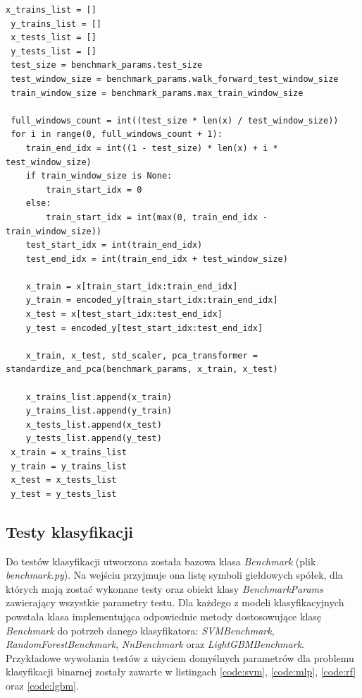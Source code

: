 \documentclass[a4paper, twoside, 11pt, openright]{article}
\begin{document}
\begin{lstlisting}[caption={Stworzenie zbiorów danych do testów metodą kroczącą (plik \textit{benchmark\_data\_preprocessing.py}).}, label={code:walk_forward_data},frame=single, captionpos=b, mathescape=true]
 x_trains_list = []
 y_trains_list = []
 x_tests_list = []
 y_tests_list = []
 test_size = benchmark_params.test_size
 test_window_size = benchmark_params.walk_forward_test_window_size
 train_window_size = benchmark_params.max_train_window_size

 full_windows_count = int((test_size * len(x) / test_window_size))
 for i in range(0, full_windows_count + 1):
    train_end_idx = int((1 - test_size) * len(x) + i * test_window_size)
    if train_window_size is None:
        train_start_idx = 0
    else:
        train_start_idx = int(max(0, train_end_idx - train_window_size))
    test_start_idx = int(train_end_idx)
    test_end_idx = int(train_end_idx + test_window_size)

    x_train = x[train_start_idx:train_end_idx]
    y_train = encoded_y[train_start_idx:train_end_idx]
    x_test = x[test_start_idx:test_end_idx]
    y_test = encoded_y[test_start_idx:test_end_idx]

    x_train, x_test, std_scaler, pca_transformer = standardize_and_pca(benchmark_params, x_train, x_test)

    x_trains_list.append(x_train)
    y_trains_list.append(y_train)
    x_tests_list.append(x_test)
    y_tests_list.append(y_test)
 x_train = x_trains_list
 y_train = y_trains_list
 x_test = x_tests_list
 y_test = y_tests_list
\end{lstlisting}

\subsection*{Testy klasyfikacji}

Do testów klasyfikacji utworzona została bazowa klasa \textit{Benchmark} (plik \textit{benchmark.py}). Na wejściu przyjmuje ona listę symboli giełdowych spółek, dla których mają zostać wykonane testy oraz obiekt klasy \textit{BenchmarkParams} zawierający wszystkie parametry testu. Dla każdego z modeli klasyfikacyjnych powstała klasa implementująca odpowiednie metody dostosowujące klasę \textit{Benchmark} do potrzeb danego klasyfikatora: \textit{SVMBenchmark}, \textit{RandomForestBenchmark}, \textit{NnBenchmark} oraz \textit{LightGBMBenchmark}. Przykładowe wywołania testów z użyciem domyślnych parametrów dla problemu klasyfikacji binarnej zostały zawarte w listingach \ref{code:svm}, \ref{code:mlp}, \ref{code:rf} oraz \ref{code:lgbm}.
\end{document}
